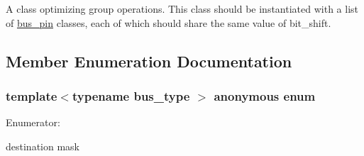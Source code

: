 A class optimizing group operations. This class should be instantiated with a list of \hyperlink{structavrpp_1_1bus_1_1bus__pin}{bus\_\-pin} classes, each of which should share the same value of bit\_\-shift. 

\subsection{Member Enumeration Documentation}
\hypertarget{structavrpp_1_1bus_1_1group__base_3_01_1_1avrpp_1_1typelist_1_1null__list_00_01bus__type_01_4_ada6840fd14155d54cef462101ef97e56}{
\subsubsection[{"@14}]{\setlength{\rightskip}{0pt plus 5cm}template$<$typename bus\_\-type $>$ anonymous enum}}
\label{structavrpp_1_1bus_1_1group__base_3_01_1_1avrpp_1_1typelist_1_1null__list_00_01bus__type_01_4_ada6840fd14155d54cef462101ef97e56}
\begin{Desc}
\item[Enumerator: ]\par
\begin{description}
\item[{\em 
\hypertarget{structavrpp_1_1bus_1_1group__base_3_01_1_1avrpp_1_1typelist_1_1null__list_00_01bus__type_01_4_ada6840fd14155d54cef462101ef97e56ab1aa4b72fcc5e6b8f53dcacaac55eafc}{
dst\_\-mask}
\label{structavrpp_1_1bus_1_1group__base_3_01_1_1avrpp_1_1typelist_1_1null__list_00_01bus__type_01_4_ada6840fd14155d54cef462101ef97e56ab1aa4b72fcc5e6b8f53dcacaac55eafc}
}]destination mask \end{description}
\end{Desc}


